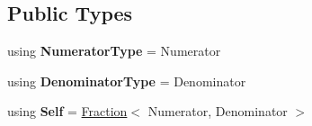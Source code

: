\subsection*{Public Types}
\begin{DoxyCompactItemize}
\item 
\hypertarget{classlatex_1_1math_1_1Fraction_a29f3b8b3550a01e920b5b25f7bc7993a}{using {\bfseries Numerator\-Type} = Numerator}\label{classlatex_1_1math_1_1Fraction_a29f3b8b3550a01e920b5b25f7bc7993a}

\item 
\hypertarget{classlatex_1_1math_1_1Fraction_a208b5f046738fd74662cd57e64092296}{using {\bfseries Denominator\-Type} = Denominator}\label{classlatex_1_1math_1_1Fraction_a208b5f046738fd74662cd57e64092296}

\item 
\hypertarget{classlatex_1_1math_1_1Fraction_a8b39e1eae942078b381addb7b5025d7b}{using {\bfseries Self} = \hyperlink{classlatex_1_1math_1_1Fraction}{Fraction}$<$ Numerator, Denominator $>$}\label{classlatex_1_1math_1_1Fraction_a8b39e1eae942078b381addb7b5025d7b}

\end{DoxyCompactItemize}
